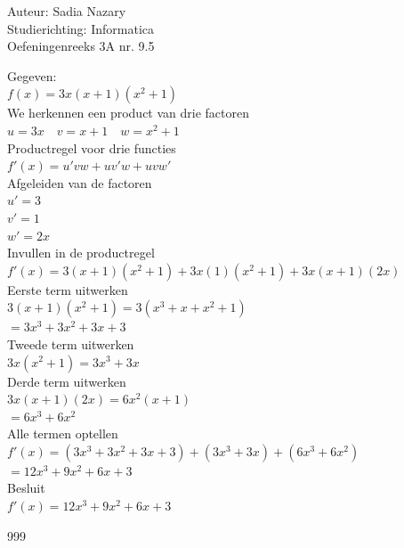 \documentclass[a4paper]{article}
\begin{document}
\noindent \large Auteur: Sadia Nazary \\
\noindent \large Studierichting: Informatica \\
\noindent \large Oefeningenreeks 3A nr. 9.5 \\

\medskip

\normalsize

Gegeven: \\

$f(x)=3x(x+1)(x^2+1)$ \\

We herkennen een product van drie factoren \\

$u=3x \quad v=x+1 \quad w=x^2+1$ \\

Productregel voor drie functies \\

$f'(x)=u'vw+uv'w+uvw'$ \\

Afgeleiden van de factoren \\

$u'=3$ \\

$v'=1$ \\

$w'=2x$ \\

Invullen in de productregel \\

$f'(x)=3(x+1)(x^2+1)+3x(1)(x^2+1)+3x(x+1)(2x)$ \\

Eerste term uitwerken \\

$3(x+1)(x^2+1)=3(x^3+x+x^2+1)$ \\

$=3x^3+3x^2+3x+3$ \\

Tweede term uitwerken \\

$3x(x^2+1)=3x^3+3x$ \\

Derde term uitwerken \\

$3x(x+1)(2x)=6x^2(x+1)$ \\

$=6x^3+6x^2$ \\

Alle termen optellen \\

$f'(x)=(3x^3+3x^2+3x+3)+(3x^3+3x)+(6x^3+6x^2)$ \\

$=12x^3+9x^2+6x+3$ \\

Besluit \\

$f'(x)=12x^3+9x^2+6x+3$ \\

\begin{thebibliography}{999}
\end{thebibliography}
\end{document}
